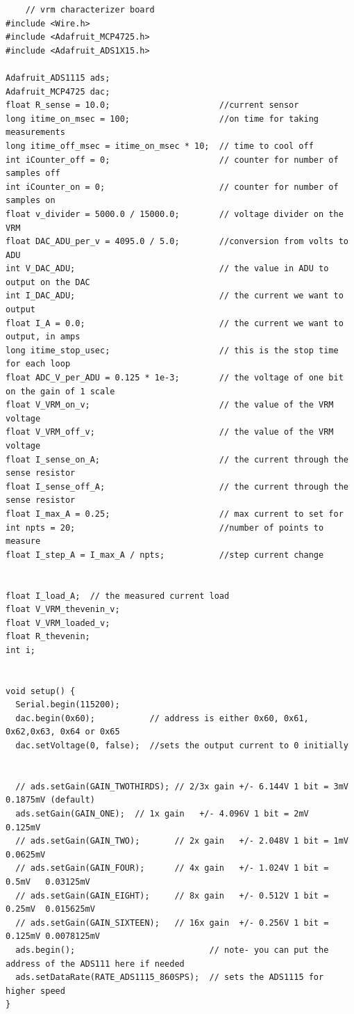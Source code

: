 \documentclass[a4paper,11pt]{article}%
\begin{document}
\begin{lstlisting}
	// vrm characterizer board
#include <Wire.h>
#include <Adafruit_MCP4725.h>
#include <Adafruit_ADS1X15.h>

Adafruit_ADS1115 ads;
Adafruit_MCP4725 dac;
float R_sense = 10.0;                      //current sensor
long itime_on_msec = 100;                  //on time for taking measurements
long itime_off_msec = itime_on_msec * 10;  // time to cool off
int iCounter_off = 0;                      // counter for number of samples off
int iCounter_on = 0;                       // counter for number of samples on
float v_divider = 5000.0 / 15000.0;        // voltage divider on the VRM
float DAC_ADU_per_v = 4095.0 / 5.0;        //conversion from volts to ADU
int V_DAC_ADU;                             // the value in ADU to output on the DAC
int I_DAC_ADU;                             // the current we want to output
float I_A = 0.0;                           // the current we want to output, in amps
long itime_stop_usec;                      // this is the stop time for each loop
float ADC_V_per_ADU = 0.125 * 1e-3;        // the voltage of one bit on the gain of 1 scale
float V_VRM_on_v;                          // the value of the VRM voltage
float V_VRM_off_v;                         // the value of the VRM voltage
float I_sense_on_A;                        // the current through the sense resistor
float I_sense_off_A;                       // the current through the sense resistor
float I_max_A = 0.25;                      // max current to set for
int npts = 20;                             //number of points to measure
float I_step_A = I_max_A / npts;           //step current change


float I_load_A;  // the measured current load
float V_VRM_thevenin_v;
float V_VRM_loaded_v;
float R_thevenin;
int i;


void setup() {
  Serial.begin(115200);
  dac.begin(0x60);           // address is either 0x60, 0x61, 0x62,0x63, 0x64 or 0x65
  dac.setVoltage(0, false);  //sets the output current to 0 initially


  // ads.setGain(GAIN_TWOTHIRDS); // 2/3x gain +/- 6.144V 1 bit = 3mV     0.1875mV (default)
  ads.setGain(GAIN_ONE);  // 1x gain   +/- 4.096V 1 bit = 2mV     0.125mV
  // ads.setGain(GAIN_TWO);       // 2x gain   +/- 2.048V 1 bit = 1mV     0.0625mV
  // ads.setGain(GAIN_FOUR);      // 4x gain   +/- 1.024V 1 bit = 0.5mV   0.03125mV
  // ads.setGain(GAIN_EIGHT);     // 8x gain   +/- 0.512V 1 bit = 0.25mV  0.015625mV
  // ads.setGain(GAIN_SIXTEEN);   // 16x gain  +/- 0.256V 1 bit = 0.125mV 0.0078125mV
  ads.begin();                           // note- you can put the address of the ADS111 here if needed
  ads.setDataRate(RATE_ADS1115_860SPS);  // sets the ADS1115 for higher speed
}



\end{lstlisting}
\end{document}
